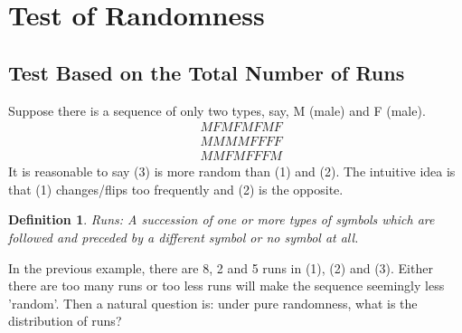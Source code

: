 \documentclass[twoside]{article}
\newtheorem*{definition*}{Definition}
\begin{document}
	\section{Test of Randomness}
	\subsection{Test Based on the Total Number of Runs}
	Suppose there is a sequence of only two types, say, M (male) and F (male).
	\begin{align}
		&MFMFMFMF \\
		&MMMMFFFF \\
		&MMFMFFFM
	\end{align}
	It is reasonable to say (3) is more random than (1) and (2). The intuitive idea is that (1) changes/flips too frequently and (2) is the opposite. 
	\begin{definition*}
		Runs: A succession of one or more types of symbols which are followed and preceded by a different symbol or no symbol  at all. 
	\end{definition*}
	In the previous example, there are 8, 2 and 5 runs in (1), (2) and (3). Either there are too many runs or too less runs will make the sequence seemingly less 'random'. Then a natural question is: under pure randomness, what is the distribution of runs? 
	
\end{document}
